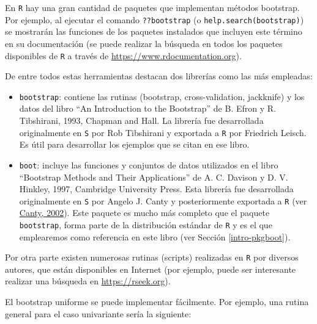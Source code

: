 \documentclass[
  spanish,
  10pt,
]{book}
\theoremstyle{break}
\theoremstyle{nonumberplain}
\begin{document}
En \texttt{R} hay una gran cantidad de paquetes que implementan métodos bootstrap.
Por ejemplo, al ejecutar el comando \texttt{??bootstrap} (o \texttt{help.search(\textquotesingle{}bootstrap\textquotesingle{})})
se mostrarán las funciones de los paquetes instalados que incluyen este término
en su documentación (se puede realizar la búsqueda en todos los paquetes disponibles
de \texttt{R} a través de \url{https://www.rdocumentation.org}).

De entre todos estas herramientas destacan dos librerías como las más empleadas:

\begin{itemize}
\item
  \texttt{bootstrap}: contiene las rutinas (bootstrap, cross-validation,
  jackknife) y los datos del libro ``An Introduction to the Bootstrap'' de B.
  Efron y R. Tibshirani, 1993, Chapman and Hall. La librería fue
  desarrollada originalmente en \texttt{S} por Rob Tibshirani y exportada a \texttt{R} por
  Friedrich Leisch. Es útil para desarrollar los ejemplos que se citan en
  ese libro.
\item
  \texttt{boot}: incluye las funciones y conjuntos de datos utilizados en el libro
  ``Bootstrap Methods and Their Applications'' de A. C. Davison y D. V. Hinkley, 1997,
  Cambridge University Press. Esta librería fue desarrollada originalmente
  en \texttt{S} por Angelo J. Canty y posteriormente exportada a \texttt{R} (ver \href{https://www.r-project.org/doc/Rnews/Rnews_2002-3.pdf}{Canty, 2002}).
  Este paquete es mucho más completo que el paquete \texttt{bootstrap}, forma parte de la distribución estándar de \texttt{R} y es el que emplearemos como referencia en este libro (ver Sección \ref{intro-pkgboot}).
\end{itemize}

Por otra parte existen numerosas rutinas (scripts) realizadas en \texttt{R} por diversos autores, que están disponibles en Internet
(por ejemplo, puede ser interesante realizar una búsqueda en \url{https://rseek.org}).

El bootstrap uniforme se puede implementar fácilmente.
Por ejemplo, una rutina general para el caso univariante sería la siguiente:
\end{document}
